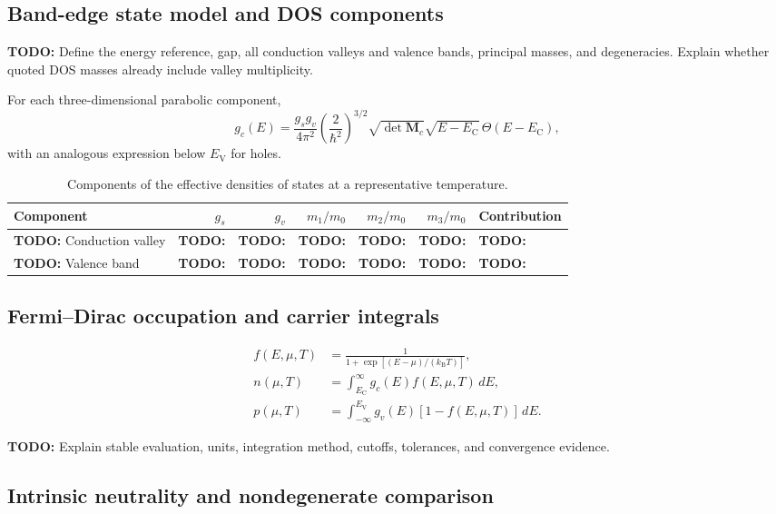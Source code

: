\documentclass[11pt,a4paper]{article}
\newcommand{\kB}{k_{\mathrm B}}
\newcommand{\Ec}{E_{\mathrm C}}
\newcommand{\Ev}{E_{\mathrm V}}
\newcommand{\todo}[1]{\textcolor{BrickRed}{\textbf{TODO:} #1}}
\begin{document}
\subsection{Band-edge state model and DOS components}

\todo{Define the energy reference, gap, all conduction valleys and valence
bands, principal masses, and degeneracies. Explain whether quoted DOS masses
already include valley multiplicity.}

For each three-dimensional parabolic component,
\begin{equation}
  g_c(E)=\frac{g_sg_v}{4\pi^2}
  \left(\frac{2}{\hbar^2}\right)^{3/2}
  \sqrt{\det\mathbf M_c}\sqrt{E-\Ec}\,\Theta(E-\Ec),
  \label{eq:dos-3d}
\end{equation}
with an analogous expression below $\Ev$ for holes.

\begin{table}[htbp]
  \centering
  \scriptsize
  \caption{Components of the effective densities of states at a representative temperature.}
  \label{tab:nc-nv-components}
  \begin{tabular}{@{}lrrrrrl@{}}
    \toprule
    Component & $g_s$ & $g_v$ & $m_1/m_0$ & $m_2/m_0$ & $m_3/m_0$ & Contribution \\
    \midrule
    \todo{Conduction valley} & \todo{ } & \todo{ } & \todo{ } & \todo{ } & \todo{ } & \todo{ } \\
    \todo{Valence band} & \todo{ } & \todo{ } & \todo{ } & \todo{ } & \todo{ } & \todo{ } \\
    \bottomrule
  \end{tabular}
\end{table}

\subsection{Fermi--Dirac occupation and carrier integrals}

\begin{align}
  f(E,\mu,T) &= \frac{1}{1+\exp[(E-\mu)/(\kB T)]}, \\
  n(\mu,T) &= \int_{\Ec}^{\infty}g_c(E)f(E,\mu,T)\,dE, \\
  p(\mu,T) &= \int_{-\infty}^{\Ev}g_v(E)[1-f(E,\mu,T)]\,dE.
\end{align}

\todo{Explain stable evaluation, units, integration method, cutoffs, tolerances,
and convergence evidence.}

\subsection{Intrinsic neutrality and nondegenerate comparison}
\end{document}
